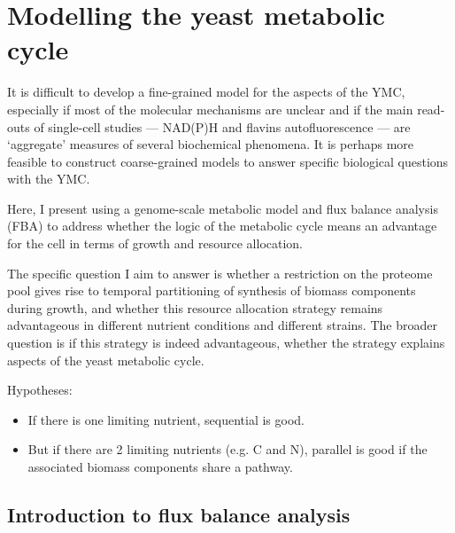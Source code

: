 \chapter{Modelling the yeast metabolic cycle}
\label{ch:model}

It is difficult to develop a fine-grained model for the aspects of the YMC,
especially if most of the molecular mechanisms are unclear
and if the main read-outs of single-cell studies --- NAD(P)H and flavins autofluorescence --- are `aggregate' measures of several biochemical phenomena.
It is perhaps more feasible to construct coarse-grained models to answer specific biological questions with the YMC.

Here, I present using a genome-scale metabolic model and flux balance analysis (FBA) to address whether the logic of the metabolic cycle means an advantage for the cell in terms of growth and resource allocation.

The specific question I aim to answer is whether a restriction on the proteome pool gives rise to temporal partitioning of synthesis of biomass components during growth, and whether this resource allocation strategy remains advantageous in different nutrient conditions and different strains.
The broader question is if this strategy is indeed advantageous, whether the strategy explains aspects of the yeast metabolic cycle.

Hypotheses:
\begin{itemize}
  \item If there is one limiting nutrient, sequential is good.
  \item But if there are 2 limiting nutrients (e.g. C and N), parallel is good if the associated biomass components share a pathway.
\end{itemize}

\section{Introduction to flux balance analysis}
\label{sec:model-fba}


